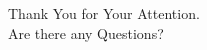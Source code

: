
\begin{frame}
	\frametitle{}
	\huge{Thank You for Your Attention.}\\
	\vspace{10mm}
	\hfill\LARGE{Are there any Questions?}
	\vfill
\end{frame}

